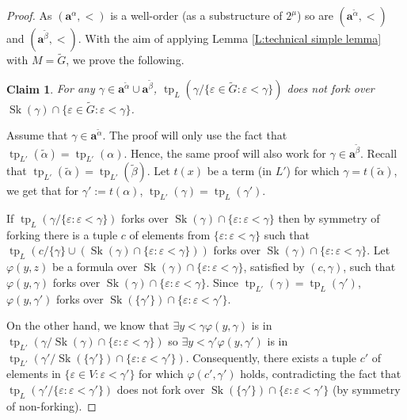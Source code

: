 \documentclass[a4paper]{amsart}
\theoremstyle{plain}
\newtheorem{claim}{Claim}[theorem]
\theoremstyle{definition}
\theoremstyle{remark}
\numberwithin{equation}{section}
\newenvironment{claimproof}[1][\proofname]
  {%
    \proof[#1]%
      \renewcommand*\qedsymbol{$\square$ (claim)}%
  }
  {%
    \endproof%
  }
\DeclareMathOperator{\tp}{tp}
\DeclareMathOperator{\Sk}{Sk}
\begin{document}
\begin{proof}
As $(\mathbf{a}^\alpha,<)$ is a well-order (as a substructure of $2^\mu$) so are $(\mathbf{a}^{\widetilde \alpha},<)$ and $(\mathbf{a}^{\widetilde \beta},<)$. With the aim of applying Lemma \ref{L:technical simple lemma} with $M=\widetilde G$, we prove the following.

\begin{claim}\label{C:forking in tilde G}
For any  $\gamma\in \mathbf{a}^{\widetilde \alpha}\cup\mathbf{a}^{\widetilde \beta}$, $\tp_{L}(\gamma/\{\varepsilon\in \widetilde G :\varepsilon<\gamma\})$ does not fork over $\Sk(\gamma)\cap\{\varepsilon\in\widetilde G:\varepsilon<\gamma\}$.
\end{claim}
\begin{claimproof}
Assume that $\gamma\in \mathbf{a}^{\widetilde \alpha}$. The proof will only use the fact that $\tp_{L'}(\widetilde \alpha)=\tp_{L'}(\alpha)$. Hence, the same proof will also work for $\gamma\in \mathbf{a}^{\widetilde \beta}$. Recall that  $\tp_{L'}(\widetilde{\alpha})=\tp_{L'}(\widetilde \beta)$. Let $t(x)$ be a term (in $L'$) for which $\gamma=t(\widetilde \alpha)$, we get that for $\gamma':=t(\alpha)$, $\tp_{L'}(\gamma)=\tp_{L}(\gamma')$.
%

If $\tp_{L}(\gamma/\{\varepsilon :\varepsilon<\gamma\})$ forks over $\Sk(\gamma)\cap\{\varepsilon:\varepsilon<\gamma\}$ then by symmetry of forking there is a tuple $c$ of elements from $\{\varepsilon:\varepsilon <\gamma\}$ such that $\tp_L(c/\{\gamma\}\cup (\Sk(\gamma)\cap \{\varepsilon:\varepsilon<\gamma\}) )$ forks over $\Sk(\gamma)\cap \{\varepsilon:\varepsilon<\gamma\}$. Let $\varphi(y,z)$ be a formula over $\Sk(\gamma)\cap \{\varepsilon:\varepsilon<\gamma\}$, satisfied by $(c,\gamma)$, such that $\varphi(y,\gamma)$  forks over $\Sk(\gamma)\cap \{\varepsilon:\varepsilon<\gamma\}$. Since $\tp_{L'}(\gamma)=\tp_{L}(\gamma')$, $\varphi(y,\gamma')$ forks over $\Sk(\{\gamma'\})\cap \{\varepsilon:\varepsilon<\gamma'\}$.

On the other hand, we know that $\exists y<\gamma \varphi(y,\gamma)$ is in $\tp_{L'}(\gamma/\Sk(\gamma)\cap \{\varepsilon:\varepsilon<\gamma\})$ so $\exists y<\gamma' \varphi(y,\gamma')$ is in $\tp_{L'}(\gamma'/\Sk(\{\gamma'\})\cap \{\varepsilon:\varepsilon<\gamma'\})$. Consequently, there exists a tuple $c'$ of elements in $\{\varepsilon\in V:\varepsilon<\gamma'\}$ for which $\varphi(c',\gamma')$ holds, contradicting the fact that $\tp_L(\gamma'/\{\varepsilon:\varepsilon<\gamma'\})$ does not fork over $\Sk(\{\gamma'\})\cap \{\varepsilon:\varepsilon<\gamma'\}$ (by symmetry of non-forking).
\end{claimproof}


\end{proof}
\end{document}
